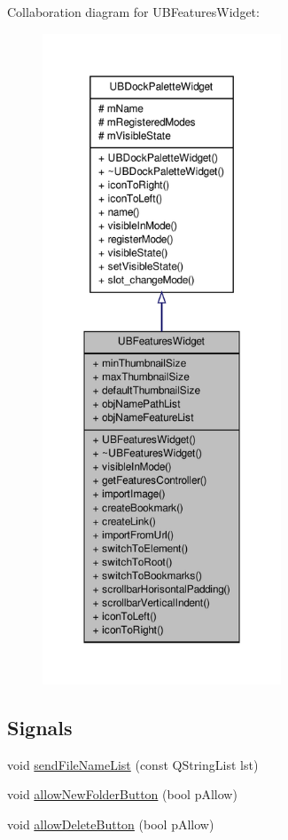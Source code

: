 Collaboration diagram for U\-B\-Features\-Widget\-:
\nopagebreak
\begin{figure}[H]
\begin{center}
\leavevmode
\includegraphics[height=550pt]{de/d6a/class_u_b_features_widget__coll__graph}
\end{center}
\end{figure}
\subsection*{Signals}
\begin{DoxyCompactItemize}
\item 
void \hyperlink{class_u_b_features_widget_abbee873a4a34ded00a04ff77b7db1592}{send\-File\-Name\-List} (const Q\-String\-List lst)
\item 
void \hyperlink{class_u_b_features_widget_a7d18f32be65dab4fdb11cb8943285fc9}{allow\-New\-Folder\-Button} (bool p\-Allow)
\item 
void \hyperlink{class_u_b_features_widget_a4f2254cacc5be2dec26bbc1df9d89c64}{allow\-Delete\-Button} (bool p\-Allow)
\end{DoxyCompactItemize}
